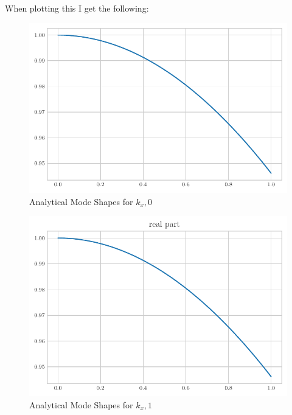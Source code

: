 \documentclass[a4paper]{article}
\begin{document}
 When plotting this I get the following:
 \begin{figure}[h!]
     \centering
     \includegraphics{k_x_0_re.pdf}
     \caption{Analytical Mode Shapes for $k_x,0$}
     \label{fig:kx0}
 \end{figure}

 \begin{figure}[h!]
     \centering
     \includegraphics{k_x_1_re.pdf}
     \caption{Analytical Mode Shapes for $k_x,1$}
     \label{fig:kx0}
 \end{figure}
\end{document}
